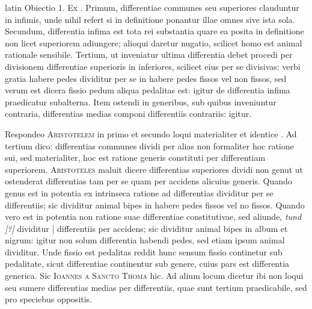 \begin{otherlanguage*}{latin}
\pstart
 Obiectio 1. Ex . Primum, differentiae communes seu superiores clauduntur in infimis, unde nihil refert si in definitione ponantur illae omnes sive ista sola. Secundum, differentia infima est tota rei substantia quare ea posita in definitione non licet superiorem adiungere; alioqui daretur nugatio, scilicet homo est animal rationale sensibile. Tertium, ut inveniatur ultima differentia debet procedi per divisionem differentiae superioris in inferiores, scilicet eius per se divisivas: verbi gratia habere pedes dividitur per se in habere pedes fissos vel non fissos, sed verum est dicera fissio pedum aliqua pedalitas est: igitur de differentia infima praedicatur subalterna. Item  ostendi in generibus, sub quibus inveniuntur contraria, differentias medias componi differentiis contrariis: igitur. 
\pend

\pstart
 Respondeo \textsc{Aristotelem} in primo et secundo loqui materialiter et identice . Ad tertium dico: differentias communes dividi per alias non formaliter hoc ratione sui, sed materialiter, hoc est ratione generis constituti per differentiam superiorem. \textsc{Aristoteles} maluit dicere differentias superiores dividi non genut ut ostenderat differentias tam per se quam per accidens alicuius generis. Quando genus est in potentia ex intrinseca ratione ad differentias dividitur per se differentiis; sic dividitur animal bipes in habere pedes fissos vel no fissos. Quando vero est in potentia non ratione suae differentiae constitutivae, sed aliunde, \emph{tund [?]} dividitur \textnormal{|} differentiis per accidens; sic dividitur animal bipes in album et nigrum: igitur non solum differentia habendi pedes, sed etiam ipsum animal dividitur. Unde fissio est pedalitas reddit hunc sensum fissio continetur sub pedalitate, sicut differentiae continentur sub genere, cuius pars est differentia generica. Sic \textsc{Ioannes a Sancto Thoma} hic. Ad alium locum dicetur ibi non loqui seu sumere differentias medias per differentiis, quae sunt tertium praedicabile, sed pro speciebus oppositis. 
\pend


\end{otherlanguage*}
